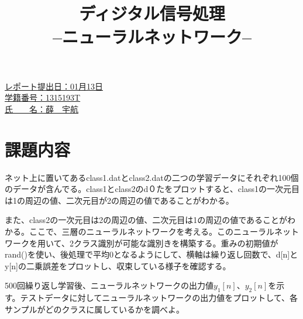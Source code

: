 \documentclass[a4j,12]{jarticle}
\def\group{グループ番号}
\def\idnumber{1315193T}
\def\name{薛　宇航}
\def\expmontho{月}
\def\expdayo{日}
\def\expmontht{月}
\def\expdayt{日}
\def\expmonthth{月}
\def\expdayth{日}
\def\deadlinem{01}
\def\deadlined{13}
\begin{document}
\title{
\vspace{1cm}{\LARGE 平成27年度}\\
\begin{spacing}{1.5}
{\Huge ディジタル信号処理}\\
{\huge --ニューラルネットワーク--}
\end{spacing}
\author{}
\date{}
}%
\maketitle
\vspace{5cm}
{\Large
\begin{spacing}{1.2}
\hspace{20em}\underline{レポート提出日：\deadlinem 月\deadlined 日}\\
\hspace{20em}\underline{学籍番号：\idnumber}\\
\hspace{20em}\underline{氏　　名：\name}\\
\end{spacing}
}
\thispagestyle{empty}
\newpage
\setcounter{page}{1}      %


\section{課題内容}
ネット上に置いてあるclass1.datとclass2.datの二つの学習データにそれぞれ100個のデータが含んでる。class1とclass2のd０たをプロットすると、class1の一次元目は1の周辺の値、二次元目が2の周辺の値であることがわかる。\par
また、class2の一次元目は2の周辺の値、二次元目は1の周辺の値であることがわかる。ここで、三層のニューラルネットワークを考える。このニューラルネットワークを用いて、2クラス識別が可能な識別きを構築する。重みの初期値がrand()を使い、後処理で平均0となるようにして、横軸は繰り返し回数で、d[n]とy[n]の二乗誤差をプロットし、収束している様子を確認する。\par
500回繰り返し学習後、ニューラルネットワークの出力値$y_1[n]$、$y_2[n]$を示す。テストデータに対してニューラルネットワークの出力値をプロットして、各サンプルがどのクラスに属しているかを調べよ。
\end{document}
